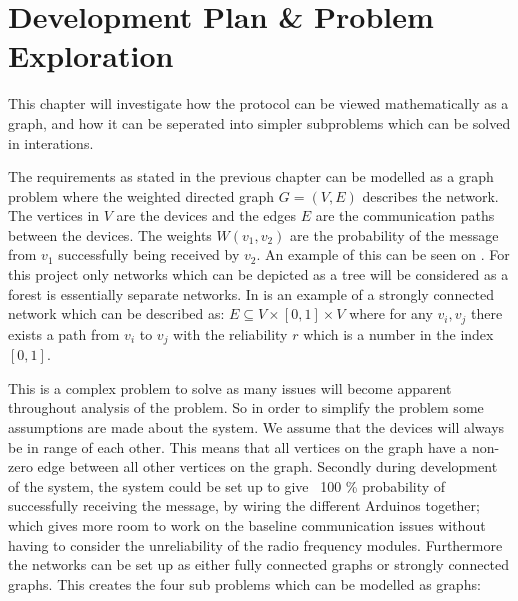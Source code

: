 \chapter{Development Plan \& Problem Exploration}\label{chp:Problems}
This chapter will investigate how the protocol can be viewed mathematically as a graph, and how it can be seperated into simpler subproblems which can be solved in interations.

\noindent The requirements as stated in the previous chapter can be modelled as a graph problem where the weighted directed graph $G = (V, E)$ describes the network. 
The vertices in $V$ are the devices and the edges $E$ are the communication paths between the devices. 
The weights $W(v_1, v_2)$ are the probability of the message from $v_1$ successfully being received by $v_2$.
An example of this can be seen on .
For this project only networks which can be depicted as a tree will be considered as a forest is essentially separate networks.
In  is an example of a strongly connected network which can be described as: $E \subseteq V \times [0,1] \times V$ where for any $v_i, v_j$ there exists a path from $v_i$ to $v_j$ with the reliability $r$ which is a number in the index $[0,1]$.


\noindent This is a complex problem to solve as many issues will become apparent throughout analysis of the problem.
So in order to simplify the problem some assumptions are made about the system.
We assume that the devices will always be in range of each other.
This means that all vertices on the graph have a non-zero edge between all other vertices on the graph.
Secondly during development of the system, the system could be set up to give ~100 \% probability of successfully receiving the message, by wiring the different Arduinos together; which gives more room to work on the baseline communication issues without having to consider the unreliability of the radio frequency modules.
Furthermore the networks can be set up as either fully connected graphs or strongly connected graphs.
This creates the four sub problems which can be modelled as graphs:  %

